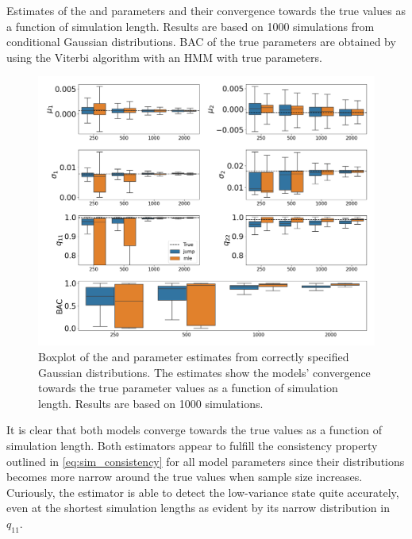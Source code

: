 \begin{table}[H]
\centering
\caption[Estimates from conditional Gaussian distributions of the \mle and \jump parameters and their convergence towards the true values]{Estimates of the \mle and \jump parameters and their convergence towards the true values as a function of simulation length. Results are based on 1000 simulations from conditional Gaussian distributions. BAC of the true parameters are obtained by using the Viterbi algorithm with an HMM with true parameters.}

\label{tab:jump_gaussian}
\end{table}

\begin{figure}[H] 
    \centering
    \includegraphics[width=1\textwidth]{analysis/model_convergence/images/simulation_normal_box.png}
    \caption[Boxplot of \mle and \jump parameter estimates from correctly specified conditional Gaussian distributions]{Boxplot of the \mle and \jump parameter estimates from correctly specified Gaussian distributions. The estimates show the models' convergence towards the true parameter values as a function of simulation length. Results are based on 1000 simulations.}
    \label{fig:jump_normal_box}
\end{figure}

It is clear that both models converge towards the true values as a function of simulation length. Both estimators appear to fulfill the consistency property outlined in \cref{eq:sim_consistency} for all model parameters since their distributions becomes more narrow around the true values when sample size increases. Curiously, the \jump estimator is able to detect the low-variance state quite accurately, even at the shortest simulation lengths as evident by its narrow distribution in $q_{11}$.

